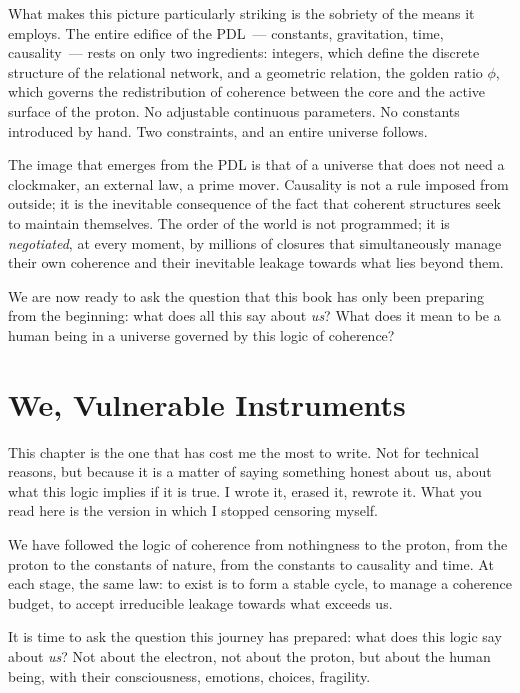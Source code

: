 \documentclass[12pt, a4paper, openright]{book}
\begin{document}
What makes this picture particularly striking is the sobriety of the means it employs. The entire edifice of the PDL~--- constants, gravitation, time, causality~--- rests on only two ingredients: integers, which define the discrete structure of the relational network, and a geometric relation, the golden ratio $\phi$, which governs the redistribution of coherence between the core and the active surface of the proton. No adjustable continuous parameters. No constants introduced by hand. Two constraints, and an entire universe follows.

\medskip

The image that emerges from the PDL is that of a universe that does not need a clockmaker, an external law, a prime mover. Causality is not a rule imposed from outside; it is the inevitable consequence of the fact that coherent structures seek to maintain themselves. The order of the world is not programmed; it is \emph{negotiated}, at every moment, by millions of closures that simultaneously manage their own coherence and their inevitable leakage towards what lies beyond them.

\medskip

We are now ready to ask the question that this book has only been preparing from the beginning: what does all this say about \emph{us}? What does it mean to be a human being in a universe governed by this logic of coherence?

\chapter{We, Vulnerable Instruments}

This chapter is the one that has cost me the most to write. Not for technical reasons, but because it is a matter of saying something honest about us, about what this logic implies if it is true. I wrote it, erased it, rewrote it. What you read here is the version in which I stopped censoring myself.

\medskip

We have followed the logic of coherence from nothingness to the proton, from the proton to the constants of nature, from the constants to causality and time. At each stage, the same law: to exist is to form a stable cycle, to manage a coherence budget, to accept irreducible leakage towards what exceeds us.

\medskip

It is time to ask the question this journey has prepared: what does this logic say about \emph{us}? Not about the electron, not about the proton, but about the human being, with their consciousness, emotions, choices, fragility.
\end{document}

